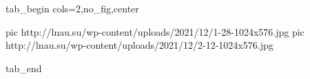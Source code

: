  
 
 
 
 

\ifcmt
  tab_begin cols=2,no_fig,center

     pic http://lnau.su/wp-content/uploads/2021/12/1-28-1024x576.jpg
		 pic http://lnau.su/wp-content/uploads/2021/12/2-12-1024x576.jpg

  tab_end
\fi

